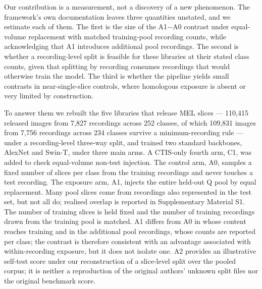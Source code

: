 Our contribution is a measurement, not a discovery of a new phenomenon. The framework's own
documentation leaves three quantities unstated, and we estimate each of them. The first is the
size of the A1$-$A0 contrast under equal-volume replacement with matched training-pool
recording counts, while acknowledging that A1 introduces additional pool recordings. The second is whether a recording-level split is feasible for these libraries at their
stated class counts, given that splitting by recording consumes recordings that would otherwise
train the model. The third is whether the pipeline yields small contrasts in near-single-slice controls,
where homologous exposure is absent or very limited by construction.

To answer them we rebuilt the five libraries that release MEL slices --- 110{,}415 released
images from 7{,}827 recordings across 252 classes, of which 109{,}831 images from 7{,}756
recordings across 234 classes survive a minimum-recording rule --- under a recording-level
three-way split, and trained two standard backbones, AlexNet and Swin-T, under three main arms.
A CTIS-only fourth arm, C1, was added to check equal-volume non-test injection. The control arm, A0, samples a fixed number of
slices per class from the training recordings and never touches a test recording. The exposure
arm, A1, injects the entire held-out Q pool by equal replacement. Many pool slices come from
recordings also represented in the test set, but not all do; realised overlap is reported in
Supplementary Material S1. The number of training slices is held fixed and the
number of training recordings drawn from the training pool is matched. A1 differs from A0 in
whose content reaches training and in the additional pool recordings, whose counts are reported
per class; the contrast is therefore consistent with an advantage associated with
within-recording exposure, but it does not isolate one. A2 provides an illustrative self-test
score under our reconstruction of a slice-level split over the pooled corpus; it is neither a
reproduction of the original authors' unknown split files nor the original benchmark score.

